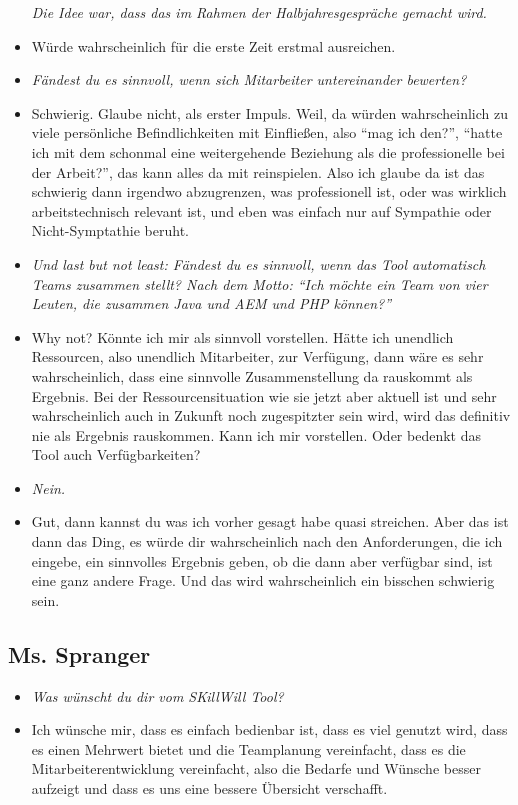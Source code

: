 \begin{appendices}
\begin{itemize}
\textit{Die Idee war, dass das im Rahmen der Halbjahresgespräche gemacht wird.}
\item[] Würde wahrscheinlich für die erste Zeit erstmal ausreichen.

\item[] \textit{Fändest du es sinnvoll, wenn sich Mitarbeiter untereinander bewerten?}
\item[] Schwierig. Glaube nicht, als erster Impuls. Weil, da würden wahrscheinlich zu viele persönliche Befindlichkeiten mit Einfließen, also “mag ich den?”, “hatte ich mit dem schonmal eine weitergehende Beziehung als die professionelle bei der Arbeit?”, das kann alles da mit reinspielen. Also ich glaube da ist das schwierig dann irgendwo abzugrenzen, was professionell ist, oder was wirklich arbeitstechnisch relevant ist, und eben was einfach nur auf Sympathie oder Nicht-Symptathie beruht.

\item[] \textit{Und last but not least: Fändest du es sinnvoll, wenn das Tool automatisch Teams zusammen stellt? Nach dem Motto: “Ich möchte ein Team von vier Leuten, die zusammen Java und AEM und PHP können?”}
\item[] Why not? Könnte ich mir als sinnvoll vorstellen. Hätte ich unendlich Ressourcen, also unendlich Mitarbeiter, zur Verfügung, dann wäre es sehr wahrscheinlich, dass eine sinnvolle Zusammenstellung da rauskommt als Ergebnis. Bei der Ressourcensituation wie sie jetzt aber aktuell ist und sehr wahrscheinlich auch in Zukunft noch zugespitzter sein wird, wird das definitiv nie als Ergebnis rauskommen. Kann ich mir vorstellen. Oder bedenkt das Tool auch Verfügbarkeiten?

\item[] \textit{Nein.}
\item[] Gut, dann kannst du was ich vorher gesagt habe quasi streichen. Aber das ist dann das Ding, es würde dir wahrscheinlich nach den Anforderungen, die ich eingebe, ein sinnvolles Ergebnis geben, ob die dann aber verfügbar sind, ist eine ganz andere Frage. Und das wird wahrscheinlich ein bisschen schwierig sein.
\end{itemize}

\newpage

\subsection{Ms. Spranger}
\begin{itemize}
\item[] \textit{Was wünscht du dir vom SKillWill Tool?}
\item[] Ich wünsche mir, dass es einfach bedienbar ist, dass es viel genutzt wird, dass es einen Mehrwert bietet und die Teamplanung vereinfacht, dass es die Mitarbeiterentwicklung vereinfacht, also die Bedarfe und Wünsche besser aufzeigt und dass es uns eine bessere Übersicht verschafft.


\end{itemize}
\end{appendices}
